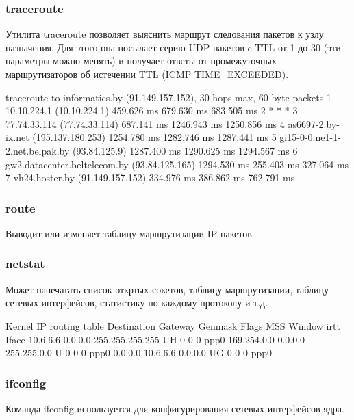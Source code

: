 \subsubsection{traceroute}
Утилита traceroute позволяет выяснить маршрут следования пакетов к узлу назначения. Для этого она посылает серию UDP пакетов c TTL от 1 до 30 (эти параметры можно менять) и получает ответы от промежуточных маршрутизаторов об истечении TTL (ICMP TIME\_EXCEEDED).
\begin{plainlst}{}{}
traceroute to informatics.by (91.149.157.152), 30 hops max, 60 byte packets
 1  10.10.224.1 (10.10.224.1)  459.626 ms  679.630 ms  683.505 ms
 2  * * *
 3  77.74.33.114 (77.74.33.114)  687.141 ms  1246.943 ms  1250.856 ms
 4  as6697-2.by-ix.net (195.137.180.253)  1254.780 ms  1282.746 ms  1287.441 ms
 5  gi15-0-0.ne1-1-2.net.belpak.by (93.84.125.9)  1287.400 ms  1290.625 ms  1294.567 ms
 6  gw2.datacenter.beltelecom.by (93.84.125.165)  1294.530 ms  255.403 ms  327.064 ms
 7  vh24.hoster.by (91.149.157.152)  334.976 ms  386.862 ms  762.791 ms
\end{plainlst}

\subsubsection{route}
Выводит или изменяет таблицу маршрутизации IP-пакетов.
\begin{plainlst}{}{}
\end{plainlst}

\subsubsection{netstat}
Может напечатать список откртых сокетов, таблицу маршрутизации, таблицу сетевых интерфейсов, статистику по каждому протоколу и т.д.
\begin{plainlst}{}{}
Kernel IP routing table
Destination   Gateway    Genmask         Flags   MSS Window  irtt Iface
10.6.6.6      0.0.0.0    255.255.255.255 UH        0 0          0 ppp0
169.254.0.0   0.0.0.0    255.255.0.0     U         0 0          0 ppp0
0.0.0.0       10.6.6.6   0.0.0.0         UG        0 0          0 ppp0
\end{plainlst}

\subsubsection{ifconfig}
Команда ifconfig используется для конфигурирования сетевых интерфейсов ядра.

